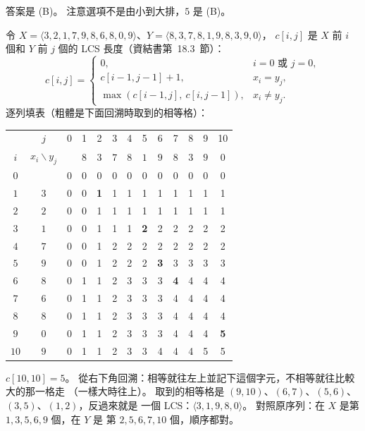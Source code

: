 \begin{pastsoln}
答案是 (B)。 注意選項不是由小到大排，$5$ 是 (B)。

令 $X = \langle 3, 2, 1, 7, 9, 8, 6, 8, 0, 9\rangle$、$Y = \langle 8, 3, 7, 8, 1, 9, 8, 3, 9, 0\rangle$，
$c[i, j]$ 是 $X$ 前 $i$ 個和 $Y$ 前 $j$ 個的 LCS 長度（資結書第~18.3~節）：
\[
c[i, j] =
\begin{cases}
0, & i = 0 \text{ 或 } j = 0,\\
c[i-1, j-1] + 1, & x_i = y_j,\\
\max(c[i-1, j],\ c[i, j-1]), & x_i \ne y_j .
\end{cases}
\]
逐列填表（粗體是下面回溯時取到的相等格）：
\begin{center}
\small
\begin{tabular}{cc|ccccccccccc}
\toprule
 & $j$ & 0 & 1 & 2 & 3 & 4 & 5 & 6 & 7 & 8 & 9 & 10 \\
$i$ & $x_i \backslash y_j$ & & $8$ & $3$ & $7$ & $8$ & $1$ & $9$ & $8$ & $3$ & $9$ & $0$ \\ \midrule
$0$ & & 0 & 0 & 0 & 0 & 0 & 0 & 0 & 0 & 0 & 0 & 0 \\
$1$ & $3$ & 0 & 0 & \textbf{1} & 1 & 1 & 1 & 1 & 1 & 1 & 1 & 1 \\
$2$ & $2$ & 0 & 0 & 1 & 1 & 1 & 1 & 1 & 1 & 1 & 1 & 1 \\
$3$ & $1$ & 0 & 0 & 1 & 1 & 1 & \textbf{2} & 2 & 2 & 2 & 2 & 2 \\
$4$ & $7$ & 0 & 0 & 1 & 2 & 2 & 2 & 2 & 2 & 2 & 2 & 2 \\
$5$ & $9$ & 0 & 0 & 1 & 2 & 2 & 2 & \textbf{3} & 3 & 3 & 3 & 3 \\
$6$ & $8$ & 0 & 1 & 1 & 2 & 3 & 3 & 3 & \textbf{4} & 4 & 4 & 4 \\
$7$ & $6$ & 0 & 1 & 1 & 2 & 3 & 3 & 3 & 4 & 4 & 4 & 4 \\
$8$ & $8$ & 0 & 1 & 1 & 2 & 3 & 3 & 3 & 4 & 4 & 4 & 4 \\
$9$ & $0$ & 0 & 1 & 1 & 2 & 3 & 3 & 3 & 4 & 4 & 4 & \textbf{5} \\
$10$ & $9$ & 0 & 1 & 1 & 2 & 3 & 3 & 4 & 4 & 4 & 5 & 5 \\
\bottomrule
\end{tabular}
\end{center}
$c[10, 10] = 5$。 從右下角回溯：相等就往左上並記下這個字元，不相等就往比較大的那一格走
（一樣大時往上）。 取到的相等格是 $(9, 10)$、$(6, 7)$、$(5, 6)$、$(3, 5)$、$(1, 2)$，反過來就是
一個 LCS：$\langle 3, 1, 9, 8, 0\rangle$。 對照原序列：在 $X$ 是第 $1, 3, 5, 6, 9$ 個，在 $Y$ 是
第 $2, 5, 6, 7, 10$ 個，順序都對。
\end{pastsoln}
